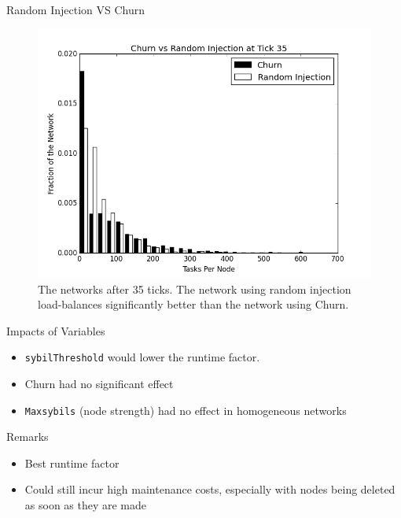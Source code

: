 \documentclass[11pt]{beamer}
\begin{document}
\begin{frame}{Random Injection VS Churn}
\begin{figure}
	\centering
	\includegraphics[width=0.7\linewidth]{figs/churnInjectionHist35}
	\caption[Churn vs Random Injection after 35 ticks.]{The networks after 35 ticks.  The network using random injection load-balances significantly better than the network using Churn.}
	\label{fig:churnInjectionHist35}
\end{figure}

\end{frame}




\begin{frame}{Impacts of Variables}
	\begin{itemize}
		\item \texttt{sybilThreshold} would lower the runtime factor.  
		\item Churn had no significant effect
		\item \texttt{Maxsybils} (node strength) had no effect in homogeneous networks
	\end{itemize}
\end{frame}


\begin{frame}{Remarks}
	\begin{itemize}
		\item Best runtime factor
		\item Could still incur high maintenance costs, especially with nodes being deleted as soon as they are made
	\end{itemize}
\end{frame}
\end{document}
